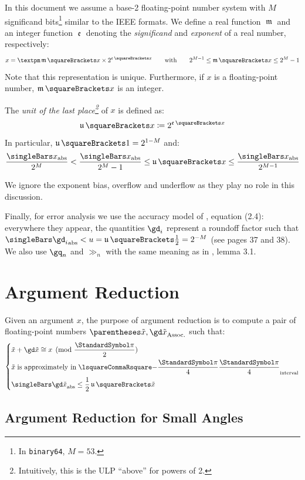 \documentclass[10pt, a4paper, twoside]{basestyle}
\DeclareMathOperator{\ULP}{\mathfrak u}
\DeclareMathOperator{\mant}{\mathfrak m}
\DeclareMathOperator{\expn}{\mathfrak e}
\newcommand{\red}[1]{\tilde{#1}}
\begin{document}
In this document we assume a base-2 floating-point number system with $M$ significand bits\footnote{In \texttt{binary64}, $M = 53$.} similar to the IEEE formats.  We define a real  function $\mant$ and an integer function $\expn$ denoting the \emph{significand} and \emph{exponent} of a real number, respectively:
\[
x = ±\mant\of{x} \times 2^{\expn\of{x}} \qquad\text{with}\qquad 2^{M-1} \leq \mant\of{x} \leq 2^M - 1
\]
Note that this representation is unique.  Furthermore, if $x$ is a floating-point number, $\mant\of{x}$ is an integer.

The \emph{unit of the last place\footnote{Intuitively, this is the ULP ``above'' for powers of 2.}} of $x$ is defined as:
\[
\ULP\of{x} \DefineAs 2^{\expn\of{x}}
\]
In particular, $\ULP\of{1} = 2^{1 - M}$ and:
\begin{equation}
\frac{\abs x}{2^M} < \frac{\abs x}{2^M - 1} \leq \ULP\of{x} \leq \frac{\abs x}{2^{M - 1}}
\label{eqnulp}
\end{equation}

We ignore the exponent bias, overflow and underflow as they play no role in this discussion.

Finally, for error analysis we use the accuracy model of \cite{Higham2002}, equation (2.4): everywhere they appear, the quantities $\gd_i$ represent a roundoff factor such that $\abs{\gd_i} < u = \ULP\of{\frac{1}{2}} = 2^{-M}$ (see pages 37 and 38).  We also use $\gq_n$ and $\gg_n$ with the same meaning as in \cite{Higham2002}, lemma 3.1.

\section*{Argument Reduction}

Given an argument $x$, the purpose of argument reduction is to compute a pair of floating-point numbers $\pa{\red x, \gd \red x}$ such that:
\[
\begin{dcases}
\red x + \gd \red x \cong x \pmod{\frac{\Pi}{2}} \\
\red x \;\text{is approximately in}\; \intclos{-\frac{\Pi}{4}}{\frac{\Pi}{4}} \\
\abs{\gd \red x} \leq \frac{1}{2} \ULP\of{\red x} 
\end{dcases}
\]

\subsection*{Argument Reduction for Small Angles}
\end{document}
